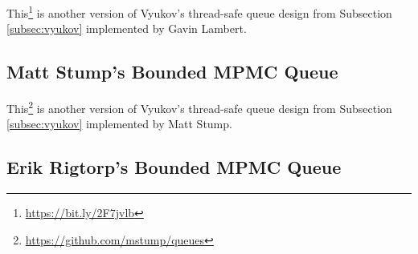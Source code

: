 	This\footnote{\url{https://bit.ly/2F7jvlb}} is another version of Vyukov's thread-safe queue design from Subsection \ref{subsec:vyukov} implemented by Gavin Lambert.

%
%	
%	
%
\subsection[Matt Stump's MPMC Queue]{Matt Stump's Bounded MPMC Queue} \label{subsec:vyukov-variation}

	This\footnote{\url{https://github.com/mstump/queues}} is another version of Vyukov's thread-safe queue design from Subsection \ref{subsec:vyukov} implemented by Matt Stump.

\subsection[Erik Rigtorp's MPMC Queue]{Erik Rigtorp's Bounded MPMC Queue} \label{subsec:rigtorp}

